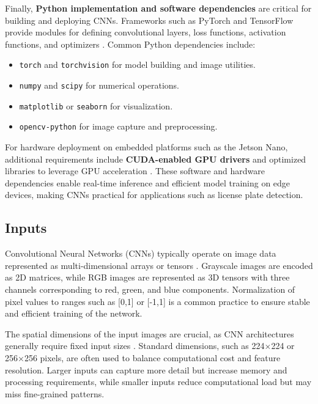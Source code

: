 Finally, \textbf{Python implementation and software dependencies} are critical for building and deploying CNNs. Frameworks such as PyTorch and TensorFlow provide modules for defining convolutional layers, loss functions, activation functions, and optimizers \cite{pytorchdocs}. Common Python dependencies include:
\begin{itemize}
	\item \texttt{torch} and \texttt{torchvision} for model building and image utilities.
	\item \texttt{numpy} and \texttt{scipy} for numerical operations.
	\item \texttt{matplotlib} or \texttt{seaborn} for visualization.
	\item \texttt{opencv-python} for image capture and preprocessing.
\end{itemize}

For hardware deployment on embedded platforms such as the Jetson Nano, additional requirements include \textbf{CUDA-enabled GPU drivers} and optimized libraries to leverage GPU acceleration \cite{jetsonpytorch}. These software and hardware dependencies enable real-time inference and efficient model training on edge devices, making CNNs practical for applications such as license plate detection.

\subsection{Inputs}

Convolutional Neural Networks (CNNs) typically operate on image data represented as multi-dimensional arrays or tensors \cite{goodfellow2016deep, pinto2022springer}. Grayscale images are encoded as 2D matrices, while RGB images are represented as 3D tensors with three channels corresponding to red, green, and blue components. Normalization of pixel values to ranges such as [0,1] or [-1,1] is a common practice to ensure stable and efficient training of the network.

The spatial dimensions of the input images are crucial, as CNN architectures generally require fixed input sizes \cite{krizhevsky2012imagenet}. Standard dimensions, such as 224×224 or 256×256 pixels, are often used to balance computational cost and feature resolution. Larger inputs can capture more detail but increase memory and processing requirements, while smaller inputs reduce computational load but may miss fine-grained patterns.

